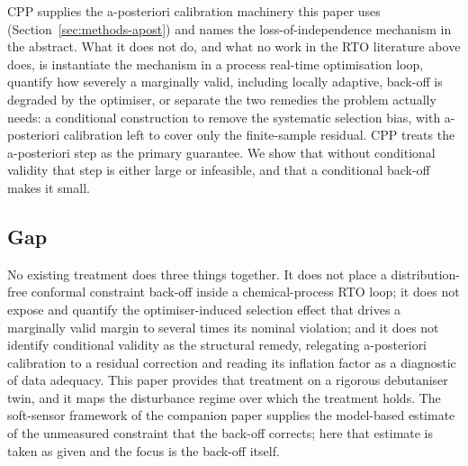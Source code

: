 CPP supplies the a-posteriori calibration machinery this paper uses
(Section~\ref{sec:methods-apost}) and names the loss-of-independence mechanism in the
abstract. What it does not do, and what no work in the RTO literature above does, is
instantiate the mechanism in a process real-time optimisation loop, quantify how severely a
marginally valid, including locally adaptive, back-off is degraded by the optimiser, or
separate the two remedies the problem actually needs: a conditional construction to remove
the systematic selection bias, with a-posteriori calibration left to cover only the
finite-sample residual. CPP treats the a-posteriori step as the primary guarantee. We show
that without conditional validity that step is either large or infeasible, and that a
conditional back-off makes it small.

\subsection{Gap}

No existing treatment does three things together. It does not place a distribution-free
conformal constraint back-off inside a chemical-process RTO loop; it does not expose and
quantify the optimiser-induced selection effect that drives a marginally valid margin to
several times its nominal violation; and it does not identify conditional validity as the
structural remedy, relegating a-posteriori calibration to a residual correction and reading
its inflation factor as a diagnostic of data adequacy. This paper provides that treatment on
a rigorous debutaniser twin, and it maps the disturbance regime over which the treatment
holds. The soft-sensor framework of the companion paper \citep{companion2026} supplies the
model-based estimate of the unmeasured constraint that the back-off corrects; here that
estimate is taken as given and the focus is the back-off itself.
